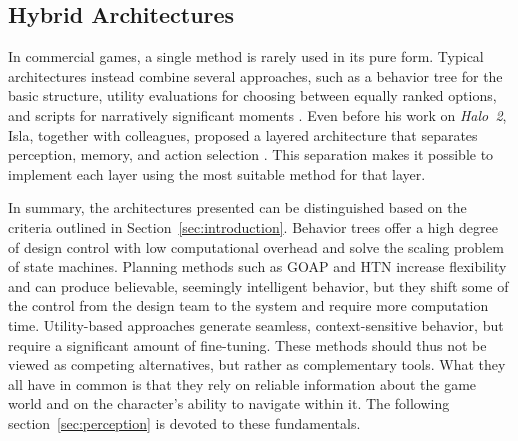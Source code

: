 \subsection{Hybrid Architectures}

In commercial games, a single method is rarely used in its pure form. Typical architectures instead combine several approaches, such as a behavior tree for the basic structure, utility evaluations for choosing between equally ranked options, and scripts for narratively significant moments \cite{rabin2013}. Even before his work on \emph{Halo~2}, Isla, together with colleagues, proposed a layered architecture that separates perception, memory, and action selection \cite{isla2001}. This separation makes it possible to implement each layer using the most suitable method for that layer.

In summary, the architectures presented can be distinguished based on the criteria outlined in Section~\ref{sec:introduction}. Behavior trees offer a high degree of design control with low computational overhead and solve the scaling problem of state machines. Planning methods such as GOAP and HTN increase flexibility and can produce believable, seemingly intelligent behavior, but they shift some of the control from the design team to the system and require more computation time. Utility-based approaches generate seamless, context-sensitive behavior, but require a significant amount of fine-tuning. These methods should thus not be viewed as competing alternatives, but rather as complementary tools. What they all have in common is that they rely on reliable information about the game world and on the character’s ability to navigate within it. The following section~\ref{sec:perception} is devoted to these fundamentals.
